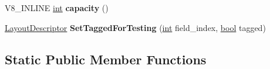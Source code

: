 \begin{DoxyCompactItemize}
\item 
\mbox{\label{classv8_1_1internal_1_1LayoutDescriptor_a3748b4375e526aee46428dfaa1dd3120}} 
V8\+\_\+\+I\+N\+L\+I\+NE \mbox{\hyperlink{classint}{int}} {\bfseries capacity} ()
\item 
\mbox{\label{classv8_1_1internal_1_1LayoutDescriptor_ab53ed9be70345d2a040f69ec17d8ce38}} 
\mbox{\hyperlink{classv8_1_1internal_1_1LayoutDescriptor}{Layout\+Descriptor}} {\bfseries Set\+Tagged\+For\+Testing} (\mbox{\hyperlink{classint}{int}} field\+\_\+index, \mbox{\hyperlink{classbool}{bool}} tagged)
\end{DoxyCompactItemize}
\subsection*{Static Public Member Functions}
